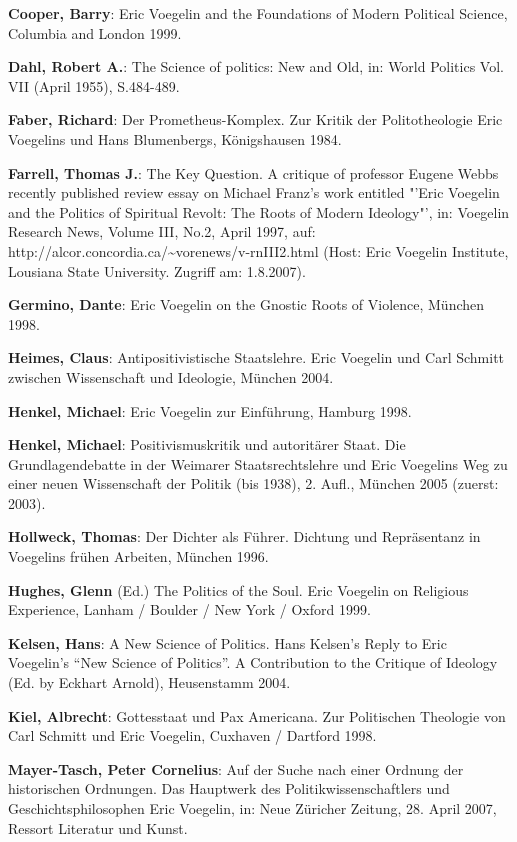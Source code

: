 {\bf Cooper, Barry}: Eric Voegelin and the Foundations of Modern Political
Science, Columbia and London 1999.

{\bf Dahl, Robert A.}: The Science of politics: New and Old, in: World
Politics Vol. VII (April 1955), S.484-489.

{\bf Faber, Richard}: Der Prometheus-Komplex. Zur Kritik der Politotheologie
Eric Voegelins und Hans Blumenbergs, Königshausen 1984.

{\bf Farrell, Thomas J.}: The Key Question. A critique of professor Eugene
Webbs recently published review essay on Michael Franz's work entitled "'Eric
Voegelin and the Politics of Spiritual Revolt: The Roots of Modern Ideology"',
in: Voegelin Research News, Volume III, No.2, April 1997, auf:
http://alcor.concordia.ca/\~{ }vorenews/v-rnIII2.html (Host: Eric Voegelin
Institute, Lousiana State University. Zugriff am: 1.8.2007).

{\bf Germino, Dante}: Eric Voegelin on the Gnostic Roots of Violence, München
1998.

{\bf Heimes, Claus}: Antipositivistische Staatslehre. Eric Voegelin und Carl
Schmitt zwischen Wissenschaft und Ideologie, München 2004.

{\bf Henkel, Michael}: Eric Voegelin zur Einführung, Hamburg 1998.

{\bf Henkel, Michael}: Positivismuskritik und autoritärer Staat. Die
Grundlagendebatte in der Weimarer Staatsrechtslehre und Eric Voegelins Weg zu
einer neuen Wissenschaft der Politik (bis 1938), 2. Aufl., München 2005
(zuerst: 2003).

{\bf Hollweck, Thomas}: Der Dichter als Führer. Dichtung und Repräsentanz in
Voegelins frühen Arbeiten, München 1996.

{\bf Hughes, Glenn} (Ed.) The Politics of the Soul. Eric Voegelin on Religious
Experience, Lanham / Boulder / New York / Oxford 1999.

{\bf Kelsen, Hans}: A New Science of Politics. Hans Kelsen's Reply to Eric
Voegelin's "`New Science of Politics"'. A Contribution to the Critique of
Ideology (Ed. by Eckhart Arnold), Heusenstamm 2004.

{\bf Kiel, Albrecht}: Gottesstaat und Pax Americana. Zur Politischen Theologie
von Carl Schmitt und Eric Voegelin, Cuxhaven / Dartford 1998.

{\bf Mayer-Tasch, Peter Cornelius}: Auf der Suche nach einer Ordnung der
historischen Ordnungen. Das Hauptwerk des Politikwissenschaftlers und
Geschichtsphilosophen Eric Voegelin, in: Neue Züricher Zeitung, 28. April
2007, Ressort Literatur und Kunst.

